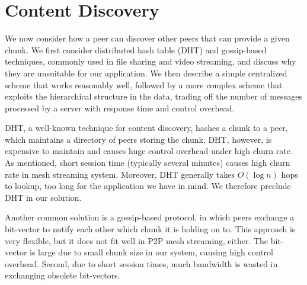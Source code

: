 
\section{Content Discovery}
\label{s:content}

    We now consider how a peer can discover other peers that can provide a given chunk.
    We first consider distributed
    hash table (DHT) and gossip-based techniques, 
    commonly used in file sharing and video streaming, and
    discuss why they are unsuitable for our application.  We then
    describe a simple centralized scheme that works reasonably well,
    followed by a more complex scheme that exploits the 
    hierarchical structure in the data, trading off
    the number of messages processed by a server with response time and control overhead.

    DHT, a well-known technique for 
    content discovery,  hashes a chunk to a
    peer, which maintains a directory of peers storing the
    chunk.  DHT, however, is expensive to maintain and 
    causes huge control overhead under high churn 
    rate.  As mentioned, %
    short session time (typically several minutes)
    causes high churn rate in mesh streaming system.
    Moreover, DHT generally takes $O(\log{n})$ hops to lookup,
    too long for the application we have in mind.
    We therefore preclude DHT in our solution.

    Another common solution is a gossip-based protocol, in which peers
    exchange a bit-vector to notify each other which chunk it is
    holding on to. This approach is very flexible, but it does not fit
    well in P2P mesh streaming, either. The bit-vector is large
    due to small chunk size in our system, causing high
    control overhead. Second, due to short session times, much
    bandwidth is wasted in exchanging obsolete bit-vectors. 


